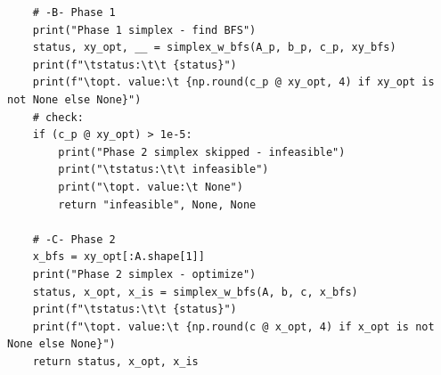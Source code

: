 \documentclass[12pt]{exam}
\begin{document}
\begin{questions}
\begin{verbatim}
    # -B- Phase 1
    print("Phase 1 simplex - find BFS")
    status, xy_opt, __ = simplex_w_bfs(A_p, b_p, c_p, xy_bfs)
    print(f"\tstatus:\t\t {status}")
    print(f"\topt. value:\t {np.round(c_p @ xy_opt, 4) if xy_opt is not None else None}")
    # check:
    if (c_p @ xy_opt) > 1e-5:
        print("Phase 2 simplex skipped - infeasible")
        print("\tstatus:\t\t infeasible")
        print("\topt. value:\t None")
        return "infeasible", None, None

    # -C- Phase 2
    x_bfs = xy_opt[:A.shape[1]]
    print("Phase 2 simplex - optimize")
    status, x_opt, x_is = simplex_w_bfs(A, b, c, x_bfs)
    print(f"\tstatus:\t\t {status}")
    print(f"\topt. value:\t {np.round(c @ x_opt, 4) if x_opt is not None else None}")
    return status, x_opt, x_is
    \end{verbatim}

\end{questions}
\end{document}
